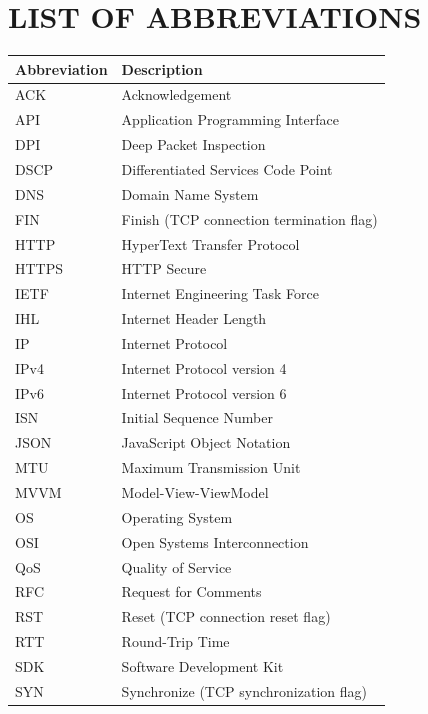 
\chapter*{LIST OF ABBREVIATIONS}

\begin{longtable}{@{}p{3cm}p{10cm}@{}}
\toprule
\textbf{Abbreviation} & \textbf{Description} \\
\midrule
\endhead

ACK     & Acknowledgement \\
API     & Application Programming Interface \\
DPI     & Deep Packet Inspection \\
DSCP    & Differentiated Services Code Point \\
DNS     & Domain Name System \\
FIN     & Finish (TCP connection termination flag) \\
HTTP    & HyperText Transfer Protocol \\
HTTPS   & HTTP Secure \\
IETF    & Internet Engineering Task Force \\
IHL     & Internet Header Length \\
IP      & Internet Protocol \\
IPv4    & Internet Protocol version 4 \\
IPv6    & Internet Protocol version 6 \\
ISN     & Initial Sequence Number \\
JSON    & JavaScript Object Notation \\
MTU     & Maximum Transmission Unit \\
MVVM    & Model-View-ViewModel \\
OS      & Operating System \\
OSI     & Open Systems Interconnection \\
QoS     & Quality of Service \\
RFC     & Request for Comments \\
RST     & Reset (TCP connection reset flag) \\
RTT     & Round-Trip Time \\
SDK     & Software Development Kit \\
SYN     & Synchronize (TCP synchronization flag) \\

\end{longtable}
